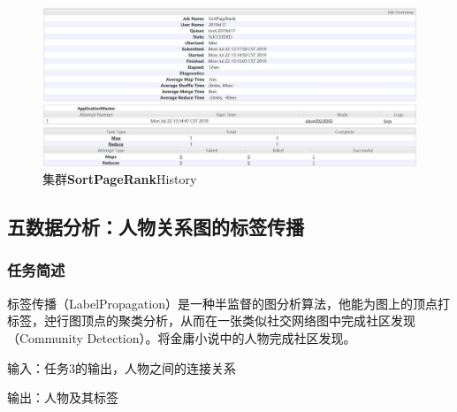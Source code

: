 \documentclass{ctexart}
\begin{document}
	\begin{figure}[H]
	\centering
	\includegraphics[width=0.8\linewidth]{pic/webui/task4_job3}
	\caption{集群\textbf{SortPageRank}History}
\end{figure}

	
	\subsection{五\quad 数据分析：人物关系图的标签传播}
	\subsubsection{任务简述}
	\par 标签传播（LabelPropagation）是一种半监督的图分析算法，他能为图上的顶点打标签，迚行图顶点的聚类分析，从而在一张类似社交网络图中完成社区发现（Community Detection）。将金庸小说中的人物完成社区发现。
	\par 输入：任务3的输出，人物之间的连接关系
	\par 输出：人物及其标签
\end{document}
